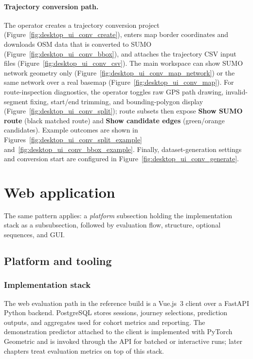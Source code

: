 

\paragraph{Trajectory conversion path.}
The operator creates a trajectory conversion project (Figure~\ref{fig:desktop_ui_conv_create}), enters map border coordinates and downloads OSM data that is converted to SUMO (Figure~\ref{fig:desktop_ui_conv_bbox}), and attaches the trajectory CSV input files (Figure~\ref{fig:desktop_ui_conv_csv}). The main workspace can show SUMO network geometry only (Figure~\ref{fig:desktop_ui_conv_map_network}) or the same network over a real basemap (Figure~\ref{fig:desktop_ui_conv_map}). For route-inspection diagnostics, the operator toggles raw GPS path drawing, invalid-segment fixing, start/end trimming, and bounding-polygon display (Figure~\ref{fig:desktop_ui_conv_split}); route subsets then expose \textbf{Show SUMO route} (black matched route) and \textbf{Show candidate edges} (green/orange candidates). Example outcomes are shown in Figures~\ref{fig:desktop_ui_conv_split_example} and~\ref{fig:desktop_ui_conv_bbox_example}. Finally, dataset-generation settings and conversion start are configured in Figure~\ref{fig:desktop_ui_conv_generate}.



\section{Web application}\label{sec:system:web}
The same pattern applies: a \emph{platform} subsection holding the implementation stack as a subsubsection, followed by evaluation flow, structure, optional sequences, and GUI.

\subsection{Platform and tooling}\label{sec:system:web:platform}
\subsubsection{Implementation stack}\label{sec:system:web:stack}
The web evaluation path in the reference build is a Vue.js~3 client over a FastAPI Python backend. PostgreSQL stores sessions, journey selections, prediction outputs, and aggregates used for cohort metrics and reporting. The demonstration predictor attached to the client is implemented with PyTorch Geometric and is invoked through the API for batched or interactive runs; later chapters treat evaluation metrics on top of this stack.

